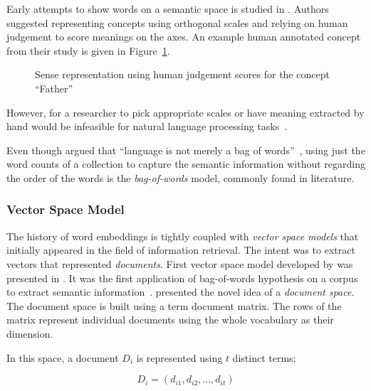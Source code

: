 Early attempts to show words on a semantic space is studied in \textcite{osgood_measurement_1957}.
Authors suggested representing concepts using orthogonal scales and relying on human judgement to score meanings on the axes.
An example human annotated concept from their study is given in Figure~\ref{fig:early_vectors}.

\begin{figure}[htbp]
    \centering
    \caption{Sense representation using human judgement scores for the concept \enquote{Father}~\cite{osgood_measurement_1957}}%
    \label{fig:early_vectors}
\end{figure}

However, for a researcher to pick appropriate scales or have meaning extracted by hand would be infeasible for natural language processing tasks~\cite{lund_producing_1996}.

Even though \citeauthor{harris_distributional_1954} argued that \enquote{language is not merely a bag of words}~\cite{harris_distributional_1954}, using just the word counts of a collection to capture the semantic information without regarding the order of the words is the \emph{bag-of-words} model, commonly found in literature.

\subsubsection{Vector Space Model}%
\label{ssub:vector_space_model}

The history of word embeddings is tightly coupled with \emph{vector space models} that initially appeared in the field of information retrieval.
The intent was to extract vectors that represented \emph{documents}.
First vector space model developed by \textcite{salton_vector_1975} was presented in .
It was the first application of bag-of-words hypothesis on a corpus to extract semantic information~\cite{turney_frequency_2010}.
\citeauthor{salton_vector_1975} presented the novel idea of a \emph{document space}.
The document space is built using a term document matrix.
The rows of the matrix represent individual documents using the whole vocabulary as their dimension.

In this space, a document $D_i$ is represented using $t$ distinct terms;

\begin{displaymath}
    D_{i} = (d_{i1}, d_{i2}, \ldots, d_{it})
\end{displaymath}


